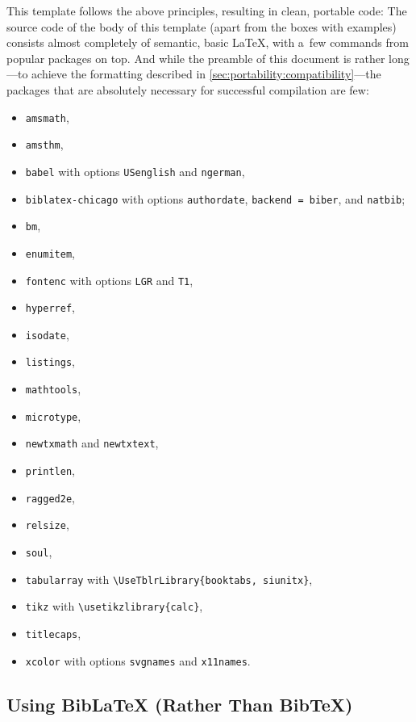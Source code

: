 This template follows the above principles, resulting in clean, portable code: The source code of the body of this template (apart from the boxes with examples) consists almost completely of semantic, basic LaTeX,
with a~few commands from popular packages on top. And while the preamble of this document is rather long---to achieve the formatting described in \autoref{sec:portability:compatibility}---the packages that are absolutely necessary for successful compilation are few:
\begin{itemize}
	\item \verb|amsmath|,
	\item \verb|amsthm|,
	\item \verb|babel| with options \verb|USenglish| and \verb|ngerman|,
	\item \verb|biblatex-chicago| with options \verb|authordate|, \verb|backend = biber|, and \verb|natbib|;
	\item \verb|bm|,
	\item \verb|enumitem|,
	\item \verb|fontenc| with options \verb|LGR| and \verb|T1|,
	\item \verb|hyperref|,
	\item \verb|isodate|,
	\item \verb|listings|,
	\item \verb|mathtools|,
	\item \verb|microtype|,
	\item \verb|newtxmath| and \verb|newtxtext|,
	\item \verb|printlen|,
	\item \verb|ragged2e|,
	\item \verb|relsize|,
	\item \verb|soul|,
	\item \verb|tabularray| with \verb|\UseTblrLibrary{booktabs, siunitx}|,
	\item \verb|tikz| with \verb|\usetikzlibrary{calc}|,
	\item \verb|titlecaps|,
	\item \verb|xcolor| with options \verb|svgnames| and \verb|x11names|.
\end{itemize}

\subsection{Using BibLaTeX (Rather Than BibTeX)}


